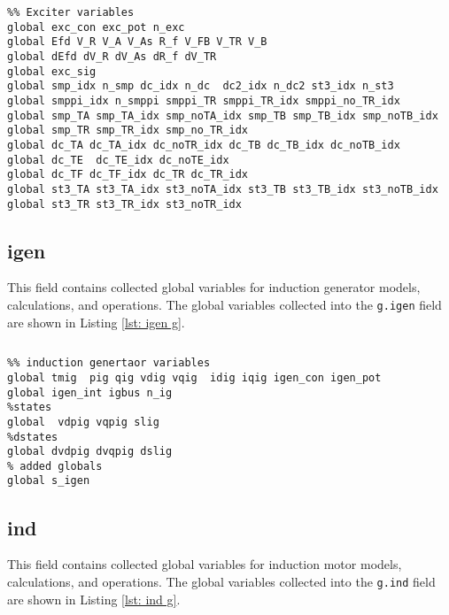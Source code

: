 \begin{lstlisting}[caption={Exciter Global Field Variables},label={lst: exc g}]
\end{lstlisting}\vspace{-2 em}
\begin{verbatim}
%% Exciter variables
global exc_con exc_pot n_exc
global Efd V_R V_A V_As R_f V_FB V_TR V_B
global dEfd dV_R dV_As dR_f dV_TR
global exc_sig 
global smp_idx n_smp dc_idx n_dc  dc2_idx n_dc2 st3_idx n_st3
global smppi_idx n_smppi smppi_TR smppi_TR_idx smppi_no_TR_idx 
global smp_TA smp_TA_idx smp_noTA_idx smp_TB smp_TB_idx smp_noTB_idx
global smp_TR smp_TR_idx smp_no_TR_idx 
global dc_TA dc_TA_idx dc_noTR_idx dc_TB dc_TB_idx dc_noTB_idx
global dc_TE  dc_TE_idx dc_noTE_idx
global dc_TF dc_TF_idx dc_TR dc_TR_idx
global st3_TA st3_TA_idx st3_noTA_idx st3_TB st3_TB_idx st3_noTB_idx
global st3_TR st3_TR_idx st3_noTR_idx
\end{verbatim}

\subsection{igen}
This field contains collected global variables for induction generator models, calculations, and operations.
The global variables collected into the \verb|g.igen| field are shown in Listing \ref{lst: igen g}.

\begin{lstlisting}[caption={Induction Generator Global Field Variables},label={lst: igen g}]
\end{lstlisting}\vspace{-2 em}
\begin{verbatim}
%% induction genertaor variables 
global tmig  pig qig vdig vqig  idig iqig igen_con igen_pot
global igen_int igbus n_ig
%states
global  vdpig vqpig slig
%dstates
global dvdpig dvqpig dslig
% added globals
global s_igen
\end{verbatim}


\subsection{ind}
This field contains collected global variables for induction motor models, calculations, and operations.
The global variables collected into the \verb|g.ind| field are shown in Listing \ref{lst: ind g}.

